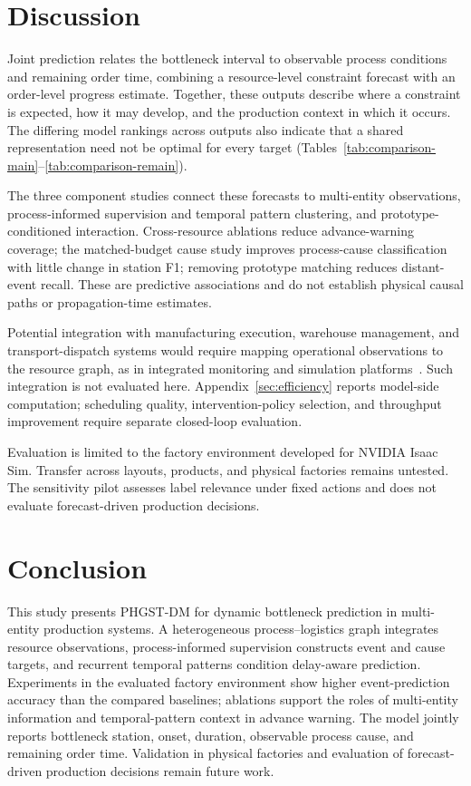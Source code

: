 \documentclass[a4paper,fleqn]{cas-dc}
\begin{document}
\FloatBarrier
\section{Discussion}\label{sec:discussion}

Joint prediction relates the bottleneck interval to observable process conditions and remaining order time, combining a resource-level constraint forecast with an order-level progress estimate. Together, these outputs describe where a constraint is expected, how it may develop, and the production context in which it occurs. The differing model rankings across outputs also indicate that a shared representation need not be optimal for every target (Tables~\ref{tab:comparison-main}--\ref{tab:comparison-remain}).

The three component studies connect these forecasts to multi-entity observations, process-informed supervision and temporal pattern clustering, and prototype-conditioned interaction. Cross-resource ablations reduce advance-warning coverage; the matched-budget cause study improves process-cause classification with little change in station F1; removing prototype matching reduces distant-event recall. These are predictive associations and do not establish physical causal paths or propagation-time estimates.

Potential integration with manufacturing execution, warehouse management, and transport-dispatch systems would require mapping operational observations to the resource graph, as in integrated monitoring and simulation platforms~\cite{leng2023monitoring}. Such integration is not evaluated here. Appendix~\ref{sec:efficiency} reports model-side computation; scheduling quality, intervention-policy selection, and throughput improvement require separate closed-loop evaluation.

Evaluation is limited to the factory environment developed for NVIDIA Isaac Sim. Transfer across layouts, products, and physical factories remains untested. The sensitivity pilot assesses label relevance under fixed actions and does not evaluate forecast-driven production decisions.

\section{Conclusion}\label{sec:conclusion}

This study presents PHGST-DM for dynamic bottleneck prediction in multi-entity production systems. A heterogeneous process--logistics graph integrates resource observations, process-informed supervision constructs event and cause targets, and recurrent temporal patterns condition delay-aware prediction. Experiments in the evaluated factory environment show higher event-prediction accuracy than the compared baselines; ablations support the roles of multi-entity information and temporal-pattern context in advance warning. The model jointly reports bottleneck station, onset, duration, observable process cause, and remaining order time. Validation in physical factories and evaluation of forecast-driven production decisions remain future work.
\end{document}
